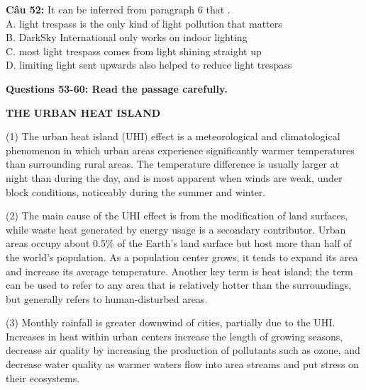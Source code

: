 \documentclass[12pt,a4paper]{article}
\begin{document}


\vspace{0.3cm}


\noindent \textbf{Câu 52:} It can be inferred from paragraph 6 that \underline{\hspace{1.2cm}}.\\
\noindent A. light trespass is the only kind of light pollution that matters\\
\noindent B. DarkSky International only works on indoor lighting\\
\noindent C. most light trespass comes from light shining straight up\\
\noindent D. limiting light sent upwards also helped to reduce light trespass




\noindent\textbf{Questions 53-60: Read the passage carefully.}%
\begin{center}\textbf{THE URBAN HEAT ISLAND}\end{center}%


\par\nobreak

(1) The urban heat island (UHI) effect is a meteorological and climatological phenomenon in which urban areas experience significantly warmer temperatures than surrounding rural areas. The temperature difference is usually larger at night than during the day, and is most apparent when winds are weak, under block conditions, noticeably during the summer and winter.

(2) The main cause of the UHI effect is from the modification of land surfaces, while waste heat generated by energy usage is a secondary contributor. Urban areas occupy about 0.5\% of the Earth's land surface but host more than half of the world's population. As a population center grows, it tends to expand its area and increase its average temperature. Another key term is heat island; the term can be used to refer to any area that is relatively hotter than the surroundings, but generally refers to human-disturbed areas.

(3) Monthly rainfall is greater downwind of cities, partially due to the UHI. Increases in heat within urban centers increase the length of growing seasons, decrease air quality by increasing the production of pollutants such as ozone, and decrease water quality as warmer waters flow into area streams and put stress on their ecosystems.
\end{document}
